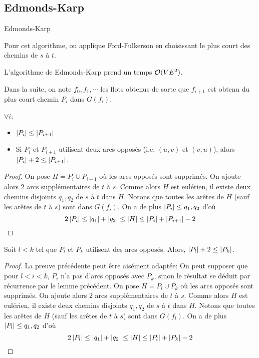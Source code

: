 \documentclass[math, info]{cours}
\begin{document}
\subsection{Edmonds-Karp}
\begin{algorithm}
	\caption{Edmonds-Karp}
	\label{alg:edmondskarp}
	Pour cet algorithme, on applique Ford-Fulkerson en choisissant le plus court des chemins de $s$ à $t$.
\end{algorithm}
\begin{thm}
	L'algorithme de Edmonds-Karp prend un temps $\mathcal{O}(VE^{2})$.
\end{thm}

Dans la suite, on note $f_{0}, f_{1},\cdots$ les flots obtenus de sorte que $f_{i + 1}$ est obtenu du plus court chemin $P_{i}$ dans $G(f_{i})$.

\begin{lemme}
	$\forall i$:
	\begin{itemize}
		\item $\left|P_{i}\right| \leq \left|P_{i + 1}\right|$
		\item Si $P_{i}$ et $P_{i + 1}$ utilisent deux arcs opposés (i.e. $(u, v)$ et $(v, u)$), alors $\left|P_{i}\right| + 2 \leq \left|P_{i + 1}\right|$.
	\end{itemize}
	\label{lem:edmondskarp1}
\end{lemme}
\begin{proof}
	On pose $H = P_{i} \cup P_{i + 1}$ où les arcs opposés sont supprimés.
	On ajoute alors $2$ arcs supplémentaires de $t$ à $s$.
	Comme alors $H$ est eulérien, il existe deux chemins disjoints $q_{1}, q_{2}$ de $s$ à $t$ dans $H$.
	Notons que toutes les arêtes de $H$ (sauf les arêtes de $t$ à $s$) sont dans $G(f_{i})$.
	On a de plus $\left|P_{i}\right| \leq q_{1}, q_{2}$ d'où
	\begin{equation*}
		2\left|P_{i}\right| \leq \left|q_{1}\right| + \left|q_{2}\right| \leq \left|H\right| \leq \left|P_{i}\right| + \left|P_{i + 1}\right| - 2
	\end{equation*}
\end{proof}

\begin{lemme}
	Soit $l < k$ tel que $P_{l}$ et $P_{k}$ utilisent des arcs opposés.
	Alors, $\left|P_{l}\right| + 2 \leq \left|P_{k}\right|$.
	\label{lem:edmondskarp2}
\end{lemme}
\begin{proof}
	La preuve précédente peut être aisément adaptée:
	On peut supposer que pour $l < i < k$, $P_{i}$ n'a pas d'arcs opposés avec $P_{k}$, sinon le résultat se déduit par récurrence par le lemme précédent.
	On pose $H = P_{l} \cup P_{k}$ où les arcs opposés sont supprimés.
	On ajoute alors $2$ arcs supplémentaires de $t$ à $s$.
	Comme alors $H$ est eulérien, il existe deux chemins disjoints $q_{1}, q_{2}$ de $s$ à $t$ dans $H$.
	Notons que toutes les arêtes de $H$ (sauf les arêtes de $t$ à $s$) sont dans $G(f_{l})$.
	On a de plus $\left|P_{l}\right| \leq q_{1}, q_{2}$ d'où
	\begin{equation*}
		2\left|P_{l}\right| \leq \left|q_{1}\right| + \left|q_{2}\right| \leq \left|H\right| \leq \left|P_{l}\right| + \left|P_{k}\right| - 2
	\end{equation*}
\end{proof}
\end{document}
